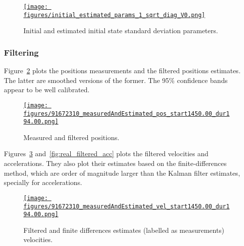 \documentclass[12pt]{article}
\begin{document}
\begin{figure}
    \centering
    \href{https://www.gatsby.ucl.ac.uk/~rapela/aman/reports/ekfForKinematicsAndHeadOrientation/figures/initial_estimated_params_1_sqrt_diag_V0.html}{\texttt{[image: figures/initial\_estimated\_params\_1\_sqrt\_diag\_V0.png]}}

    \caption{Initial and estimated initial state standard deviation parameters.}

    \label{fig:realData_sqrt_diag_V0_params}
\end{figure}

\subsubsection*{Filtering}

Figure~\ref{fig:real_filtered_pos} plots the positions measurements and the filtered positions
estimates. The latter are smoothed versions of the former. The 95\% confidence
bands appear to be well calibrated.

\begin{figure}
    \centering
    \href{https://www.gatsby.ucl.ac.uk/~rapela/aman/reports/ekfForKinematicsAndHeadOrientation/figures/91672310_measuredAndEstimated_pos_start1450.00_dur194.00.html}{\texttt{[image: figures/91672310\_measuredAndEstimated\_pos\_start1450.00\_dur194.00.png]}}

    \caption{Measured and filtered positions.}

    \label{fig:real_filtered_pos}
\end{figure}

Figures~\ref{fig:real_filtered_vel} and~\ref{fig:real_filtered_acc} plots the
filtered velocities and accelerations. They also plot their estimates
based on the finite-differences method, which are order of magnitude larger
than the Kalman filter estimates, specially
for accelerations.

\begin{figure}
    \centering
    \href{https://www.gatsby.ucl.ac.uk/~rapela/aman/reports/ekfForKinematicsAndHeadOrientation/figures/91672310_measuredAndEstimated_vel_start1450.00_dur194.00.html}{\texttt{[image: figures/91672310\_measuredAndEstimated\_vel\_start1450.00\_dur194.00.png]}}

    \caption{Filtered and finite differences estimates (labelled as
    measurements) velocities.}

    \label{fig:real_filtered_vel}
\end{figure}
\end{document}
